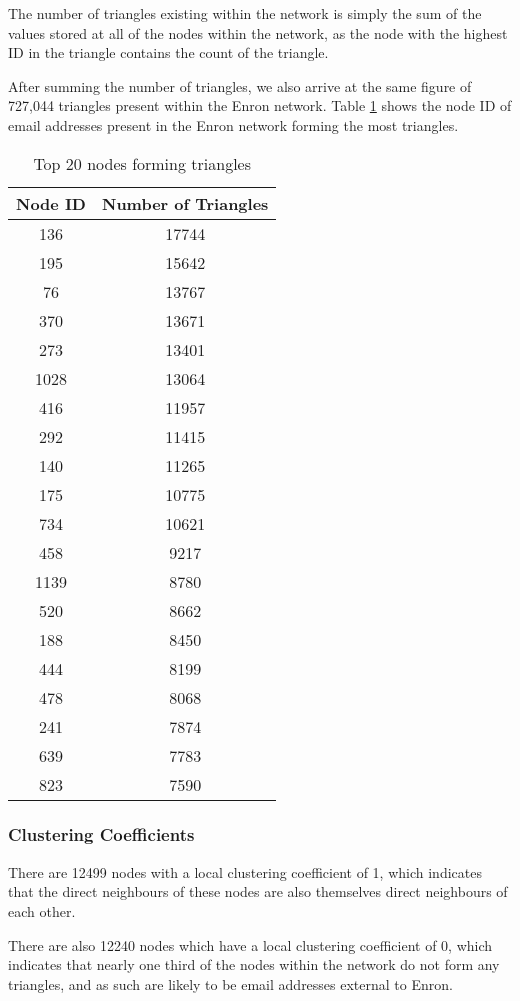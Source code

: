 The number of triangles existing within the network is simply the sum of the values stored at all of the nodes within the network, as the node with the highest ID in the triangle contains the count of the triangle.

After summing the number of triangles, we also arrive at the same figure of 727,044 triangles present within the Enron network. Table \ref{tab:enrontriangles} shows the node ID of email addresses present in the Enron network forming the most triangles.

\begin{table}%
\centering
\begin{tabular}{|c|c|}
\hline
Node ID & Number of Triangles \\
\hline
136 & 17744 \\
195 & 15642 \\
76 & 13767 \\
370 & 13671 \\
273 & 13401 \\
1028 & 13064 \\
416 & 11957 \\
292 & 11415 \\
140 & 11265 \\
175 & 10775 \\
734 & 10621 \\
458 & 9217 \\
1139 & 8780 \\
520 & 8662 \\
188 & 8450 \\
444 & 8199 \\
478 & 8068 \\
241 & 7874 \\
639 & 7783 \\
823 & 7590 \\
\hline
\end{tabular}
\caption{Top 20 nodes forming triangles}
\label{tab:enrontriangles}
\end{table}

\subsubsection{Clustering Coefficients}
There are 12499 nodes with a local clustering coefficient of 1, which indicates that the direct neighbours of these nodes are also themselves direct neighbours of each other.

There are also 12240 nodes which have a local clustering coefficient of 0, which indicates that nearly one third of the nodes within the network do not form any triangles, and as such are likely to be email addresses external to Enron.


